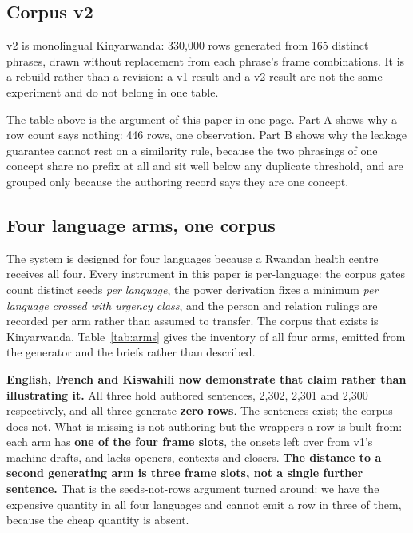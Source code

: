 \subsection{Corpus v2}

v2 is monolingual Kinyarwanda: 330{,}000 rows generated from 165 distinct
phrases, drawn without replacement from each phrase's frame combinations. It is
a rebuild rather than a revision: a v1 result and a v2 result are not the same
experiment and do not belong in one table.



The table above is the argument of this paper in one page. Part A shows why a
row count says nothing: 446 rows, one observation. Part B shows why the leakage
guarantee cannot rest on a similarity rule, because the two phrasings of one
concept share no prefix at all and sit well below any duplicate threshold, and
are grouped only because the authoring record says they are one concept.

\subsection{Four language arms, one corpus}
\label{sec:method:arms}

The system is designed for four languages because a Rwandan health centre
receives all four. Every instrument in this paper is per-language: the corpus
gates count distinct seeds \emph{per language}, the power derivation fixes a
minimum \emph{per language crossed with urgency class}, and the person and
relation rulings are recorded per arm rather than assumed to transfer. The
corpus that exists is Kinyarwanda. Table~\ref{tab:arms} gives the inventory of
all four arms, emitted from the generator and the briefs rather than described.



\textbf{English, French and Kiswahili now demonstrate that claim rather than
illustrating it.} All three hold authored sentences, 2{,}302, 2{,}301 and
2{,}300 respectively, and all three generate \textbf{zero rows}. The sentences
exist; the corpus does not. What is missing is not authoring but the wrappers a
row is built from: each arm has \textbf{one of the four frame slots}, the onsets
left over from v1's machine drafts, and lacks openers, contexts and closers.
\textbf{The distance to a second generating arm is three frame slots, not a
single further sentence.} That is the seeds-not-rows argument turned around: we
have the expensive quantity in all four languages and cannot emit a row in three
of them, because the cheap quantity is absent.

